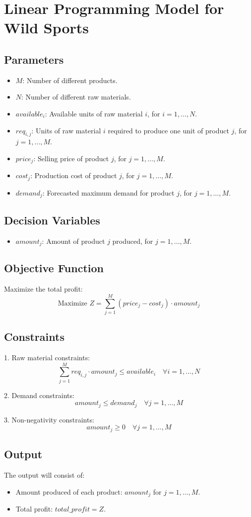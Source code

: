 \documentclass{article}
\begin{document}
\section*{Linear Programming Model for Wild Sports}

\subsection*{Parameters}
\begin{itemize}
    \item $M$: Number of different products.
    \item $N$: Number of different raw materials.
    \item $available_i$: Available units of raw material $i$, for $i = 1, \ldots, N$.
    \item $req_{i,j}$: Units of raw material $i$ required to produce one unit of product $j$, for $j = 1, \ldots, M$.
    \item $price_j$: Selling price of product $j$, for $j = 1, \ldots, M$.
    \item $cost_j$: Production cost of product $j$, for $j = 1, \ldots, M$.
    \item $demand_j$: Forecasted maximum demand for product $j$, for $j = 1, \ldots, M$.
\end{itemize}

\subsection*{Decision Variables}
\begin{itemize}
    \item $amount_j$: Amount of product $j$ produced, for $j = 1, \ldots, M$.
\end{itemize}

\subsection*{Objective Function}
Maximize the total profit:
\[
\text{Maximize } Z = \sum_{j=1}^{M} (price_j - cost_j) \cdot amount_j
\]

\subsection*{Constraints}
1. Raw material constraints:
\[
\sum_{j=1}^{M} req_{i,j} \cdot amount_j \leq available_i \quad \forall i = 1, \ldots, N
\]

2. Demand constraints:
\[
amount_j \leq demand_j \quad \forall j = 1, \ldots, M
\]

3. Non-negativity constraints:
\[
amount_j \geq 0 \quad \forall j = 1, \ldots, M
\]

\subsection*{Output}
The output will consist of:
\begin{itemize}
    \item Amount produced of each product: $amount_j$ for $j = 1, \ldots, M$.
    \item Total profit: $total\_profit = Z$.
\end{itemize}
\end{document}
